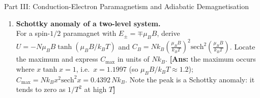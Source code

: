 \documentclass[11pt,a4paper]{article}
\begin{document}
\begin{assignmentbox}{Part III: Conduction-Electron Paramagnetism and Adiabatic Demagnetisation}
\begin{enumerate}[label=\textbf{III.\arabic*.}, leftmargin=*]
    \item \textbf{Schottky anomaly of a two-level system.}\\
    For a spin-$1/2$ paramagnet with $E_\pm = \mp\mu_B B$, derive $U = -N\mu_B B\tanh(\mu_B B/k_BT)$ and $C_B = Nk_B\left(\frac{\mu_B B}{k_BT}\right)^2\mathrm{sech}^2\left(\frac{\mu_B B}{k_BT}\right)$. Locate the maximum and express $C_{\max}$ in units of $Nk_B$.
    \textbf{[Ans:} the maximum occurs where $x\tanh x = 1$, i.e.\ $x = 1.1997$ (so $\mu_B B/k_BT \approx 1.2$); $C_{\max} = Nk_B x^2\mathrm{sech}^2x = 0.4392\,Nk_B$. Note the peak is a Schottky anomaly: it tends to zero as $1/T^2$ at high $T$\textbf{]}

\end{enumerate}
\end{assignmentbox}

\end{document}
